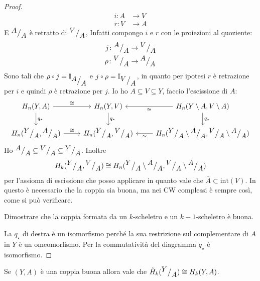 \begin{proof}
\begin{align*}
    i \colon A & \to V \\
    r \colon V & \to A
  \end{align*}
  E $ {^{\textstyle A}\big/_{\textstyle A}} $ è retratto di $ {^{\textstyle V}\big/_{\textstyle A}} $,
  Infatti compongo $ i $ e $ r $ con le proiezioni al quoziente:
  \begin{align*}
    j \colon {^{\textstyle A}\big/_{\textstyle A}} & \to {^{\textstyle V}\big/_{\textstyle A}} \\
    \rho \colon {^{\textstyle V}\big/_{\textstyle A}} & \to {^{\textstyle A}\big/_{\textstyle A}}
  \end{align*}
  Sono tali che $ \rho \circ j = \Id{\quot{A}{A}} $ e $ j \circ \rho = \Id{\quot{V}{A}} $,
  in quanto per ipotesi $ r $ è retrazione per $ i $ e
  quindi $ \rho $ è retrazione per $ j $.
  Io ho $ A \subseteq V \subseteq Y $, faccio l'escissione di $ A $:
  \[
    \begin{tikzcd}
      H_n(Y,A) \rar{\cong} \dar{q_\star} & H_n(Y,V)  \dar{q_\star}& H_n({Y} \setminus {A}, {V} \setminus {A}) \lar{\cong} \dar{q_\star} \\
      H_n(\quot{Y}{A}, \quot{A}{A}) \rar{\cong} & H_n(\quot{Y}{A}, \quot{V}{A}) & H_n(\quot{Y}{A} \setminus \quot{A}{A}, \quot{V}{A} \setminus \quot{A}{A}) \lar{\cong}
    \end{tikzcd}
  \]
  Ho $ {^{\textstyle A}\big/_{\textstyle A}} \subseteq {^{\textstyle V}\big/_{\textstyle A}} \subseteq {^{\textstyle Y}\big/_{\textstyle A}} $.
  Inoltre
  \[
    H_k({^{\textstyle Y}\big/_{\textstyle A}}, {^{\textstyle V}\big/_{\textstyle A}}) \cong H_n({^{\textstyle Y}\big/_{\textstyle A}} \setminus {^{\textstyle A}\big/_{\textstyle A}}, {^{\textstyle V}\big/_{\textstyle A}} \setminus {^{\textstyle A}\big/_{\textstyle A}})
  \]
  per l'assioma di escissione che posso applicare in quanto vale che $ \bar{A} \subset \mathrm{int}(V) $.
  In questo è necessario che la coppia sia buona, ma nei CW complessi è sempre così, come si può
  verificare.
  \begin{exercise}
    Dimostrare che la coppia formata da un $ k $-scheletro e un $ k-1 $-scheletro è buona.
  \end{exercise}
  La $ q_\star $ di destra è un isomorfismo perché la sua restrizione sul complementare di $ A $
  in $ Y $ è un omeomorfismo. Per la commutatività del diagramma $ q_\star $ è isomorfismo.
\end{proof}
\begin{corollary}
  Se $ (Y,A) $ è una coppia buona allora vale che $ \tilde{H}_k({^{\textstyle Y}\big/_{\textstyle A}}) \cong H_k(Y,A) $.
\end{corollary}

